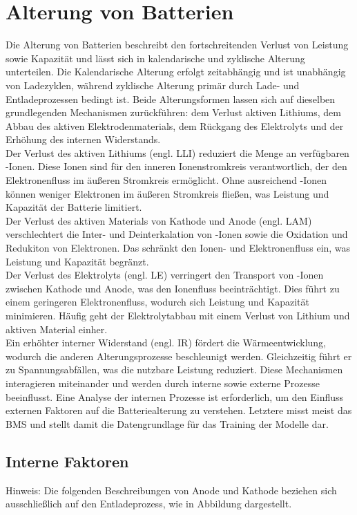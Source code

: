 \section{Alterung von Batterien}
Die Alterung von Batterien beschreibt den fortschreitenden Verlust von Leistung sowie Kapazität und lässt sich in kalendarische und zyklische Alterung unterteilen. Die Kalendarische Alterung erfolgt zeitabhängig und ist unabhängig von Ladezyklen, während zyklische Alterung primär durch Lade- und Entladeprozessen bedingt ist. Beide Alterungsformen lassen sich auf dieselben grundlegenden Mechanismen zurückführen: dem Verlust aktiven Lithiums, dem Abbau des aktiven Elektrodenmaterials, dem Rückgang des Elektrolyts und der Erhöhung des internen Widerstands.\\
Der Verlust des aktiven Lithiums (engl. \ac{LLI}) reduziert die Menge an verfügbaren -Ionen. Diese Ionen sind für den inneren Ionenstromkreis verantwortlich, der den Elektronenfluss im äußeren Stromkreis ermöglicht. Ohne ausreichend -Ionen können weniger Elektronen im äußeren Stromkreis fließen, was Leistung und Kapazität der Batterie limitiert.\\
Der Verlust des aktiven Materials von Kathode und Anode (engl. \ac{LAM}) verschlechtert die Inter- und Deinterkalation von -Ionen sowie die Oxidation und Redukiton von Elektronen. Das schränkt den Ionen- und Elektronenfluss ein, was Leistung und Kapazität begränzt.\\
Der Verlust des Elektrolyts (engl. \ac{LE}) verringert den Transport von -Ionen zwischen Kathode und Anode, was den Ionenfluss beeinträchtigt. Dies führt zu einem geringeren Elektronenfluss, wodurch sich Leistung und Kapazität minimieren. Häufig geht der Elektrolytabbau mit einem  Verlust von Lithium und aktiven Material einher.\\
Ein erhöhter interner Widerstand (engl. \ac{IR}) fördert die Wärmeentwicklung, wodurch die anderen Alterungsprozesse beschleunigt werden. Gleichzeitig führt er zu Spannungsabfällen, was die nutzbare Leistung reduziert.
Diese Mechanismen interagieren miteinander und werden durch interne sowie externe Prozesse beeinflusst. Eine Analyse der internen Prozesse ist erforderlich, um den Einfluss externen Faktoren auf die Batteriealterung zu verstehen. Letztere misst meist das \ac{BMS} und stellt damit die Datengrundlage für das Training der Modelle dar.

\subsection{Interne Faktoren}
Hinweis: Die folgenden Beschreibungen von Anode und Kathode beziehen sich ausschließlich auf den Entladeprozess, wie in Abbildung dargestellt.
